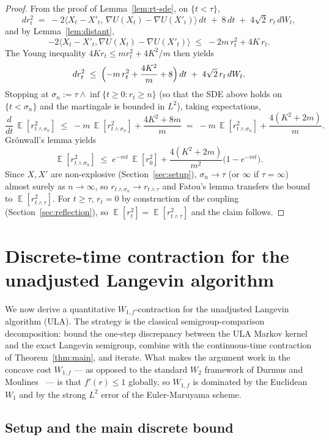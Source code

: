 \documentclass[11pt]{article}
\theoremstyle{definition}
\DeclareMathOperator{\E}{\mathbb{E}}
\begin{document}
\begin{proof}
From the proof of Lemma~\ref{lem:rt-sde}, on $\{t < \tau\}$,
\[
dr_t^2 \;=\; -2\langle X_t - X'_t,\, \nabla U(X_t) - \nabla U(X'_t)\rangle\,dt \;+\; 8\,dt \;+\; 4\sqrt 2\, r_t\, dW_t,
\]
and by Lemma~\ref{lem:distant},
\[
-2\langle X_t - X'_t, \nabla U(X_t) - \nabla U(X'_t)\rangle \;\le\; -2 m\, r_t^2 + 4 K\, r_t.
\]
The Young inequality $4K r_t \le m r_t^2 + 4K^2/m$ then yields
\[
dr_t^2 \;\le\; \Bigl(-m\, r_t^2 + \frac{4K^2}{m} + 8\Bigr)\,dt \;+\; 4\sqrt 2\, r_t\, dW_t.
\]
Stopping at $\sigma_n := \tau \wedge \inf\{t \ge 0: r_t \ge n\}$ (so that the SDE above holds on $\{t < \sigma_n\}$ and the martingale is bounded in $L^2$), taking expectations,
\[
\frac{d}{dt}\,\E[r_{t \wedge \sigma_n}^2] \;\le\; -m\,\E[r_{t \wedge \sigma_n}^2] + \frac{4K^2 + 8m}{m} \;=\; -m\,\E[r_{t \wedge \sigma_n}^2] + \frac{4(K^2 + 2m)}{m}.
\]
Gr\"onwall's lemma yields
\[
\E[r_{t \wedge \sigma_n}^2] \;\le\; e^{-m t}\,\E[r_0^2] + \frac{4(K^2 + 2m)}{m^2}\bigl(1 - e^{-m t}\bigr).
\]
Since $X,X'$ are non-explosive (Section~\ref{sec:setup}), $\sigma_n \to \tau$ (or $\infty$ if $\tau = \infty$) almost surely as $n \to \infty$, so $r_{t \wedge \sigma_n} \to r_{t \wedge \tau}$ and Fatou's lemma transfers the bound to $\E[r_{t \wedge \tau}^2]$. For $t \ge \tau$, $r_t = 0$ by construction of the coupling (Section~\ref{sec:reflection}), so $\E[r_t^2] = \E[r_{t \wedge \tau}^2]$ and the claim follows.
\end{proof}

\section{Discrete-time contraction for the unadjusted Langevin algorithm}\label{sec:ula}

We now derive a quantitative $W_{1,f}$-contraction for the unadjusted Langevin algorithm (ULA). The strategy is the classical semigroup-comparison decomposition: bound the one-step discrepancy between the ULA Markov kernel and the exact Langevin semigroup, combine with the continuous-time contraction of Theorem~\ref{thm:main}, and iterate. What makes the argument work in the concave cost $W_{1,f}$ --- as opposed to the standard $W_2$ framework of Durmus and Moulines~\cite{DurmusMoulines2019} --- is that $f'(r) \le 1$ globally, so $W_{1,f}$ is dominated by the Euclidean $W_1$ and by the strong $L^2$ error of the Euler-Maruyama scheme.

\subsection{Setup and the main discrete bound}
\end{document}

